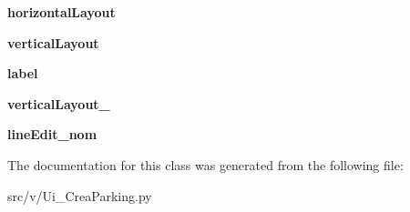 \begin{DoxyCompactItemize}
\item 
\hypertarget{classv_1_1_ui___crea_parking_1_1_ui___crea_parking_a7fe00b7f07099b528dd0f2ae685fa9a1}{}{\bfseries horizontal\+Layout}\label{classv_1_1_ui___crea_parking_1_1_ui___crea_parking_a7fe00b7f07099b528dd0f2ae685fa9a1}

\item 
\hypertarget{classv_1_1_ui___crea_parking_1_1_ui___crea_parking_a6fa6c25545a2b2466491215442e20418}{}{\bfseries vertical\+Layout}\label{classv_1_1_ui___crea_parking_1_1_ui___crea_parking_a6fa6c25545a2b2466491215442e20418}

\item 
\hypertarget{classv_1_1_ui___crea_parking_1_1_ui___crea_parking_a7add11345e0c86ce35eca428549f073e}{}{\bfseries label}\label{classv_1_1_ui___crea_parking_1_1_ui___crea_parking_a7add11345e0c86ce35eca428549f073e}

\item 
\hypertarget{classv_1_1_ui___crea_parking_1_1_ui___crea_parking_ac9fda1b036c1c70a97885d83a47c660c}{}{\bfseries vertical\+Layout\+\_}\label{classv_1_1_ui___crea_parking_1_1_ui___crea_parking_ac9fda1b036c1c70a97885d83a47c660c}

\item 
\hypertarget{classv_1_1_ui___crea_parking_1_1_ui___crea_parking_ad301227cde876399bf0bb7e02f1a2f51}{}{\bfseries line\+Edit\+\_\+nom}\label{classv_1_1_ui___crea_parking_1_1_ui___crea_parking_ad301227cde876399bf0bb7e02f1a2f51}

\end{DoxyCompactItemize}


The documentation for this class was generated from the following file\+:\begin{DoxyCompactItemize}
\item 
src/v/Ui\+\_\+\+Crea\+Parking.\+py\end{DoxyCompactItemize}
